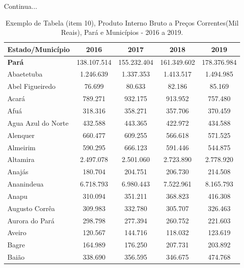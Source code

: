 \newpage
\begin{table}[!htb]
    \centering
    {
    \caption{Exemplo de Tabela (item 10), Produto Interno Bruto a Preços Correntes(Mil Reais), Pará e Municípios - 2016 a 2019.}  Continua...
    \label{item 10 regras1}
    \vspace{0.1cm}
\begin{tabular}{l|c|c|c|c}
  \hline\hline
  Estado/Município        &     2016    &      2017   &    2018     &     2019     \\
  \hline\hline
   \textbf{Pará}          & 138.107.514 & 155.232.404 & 161.349.602 & 178.376.984  \\
   Abaetetuba             & 1.246.639   & 1.337.353   & 1.413.517   & 1.494.985    \\
   Abel Figueiredo        &   76.699    &   80.633    &   82.186    &   85.169     \\
   Acará                  &   789.271   &   932.175   &  913.952    & 757.480      \\
   Afuá                   &   318.316   &  358.271    &  357.706    &  370.459     \\ 
   Agua Azul do Norte     &  432.588    &   443.365   &  422.972    &  434.588     \\
   Alenquer               &   660.477   &   609.255   &  566.618    &  571.525     \\
   Almeirim               &  590.295    &   666.123   &  591.446    &  544.875     \\
   Altamira               &  2.497.078  &  2.501.060  &  2.723.890  &  2.778.920   \\
   Anajás                 &  180.704    &  204.751    &  206.730    &  214.508     \\
   Ananindeua             &  6.718.793  &  6.980.443  &  7.522.961  &  8.165.793   \\
   Anapu                  &  310.094    &  351.211    &  368.823    &  416.308     \\
   Augusto Corrêa         & 309.983     &  332.780    &  305.707    &  326.463     \\
   Aurora do Pará         &  298.798    &  277.394    &  260.752    &  221.603      \\
   Aveiro                 &  120.567    &  144.716    &  118.032    &  123.619      \\
   Bagre                  &  164.989    &  176.250    &  207.731    &  203.892      \\
   Baião                  &  338.690    &  356.595    &  346.675    &  474.768      \\

\end{tabular}}
\end{table}
